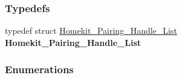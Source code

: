 \subsubsection*{Typedefs}
\begin{DoxyCompactItemize}
\item 
typedef struct \hyperlink{struct_homekit___pairing___handle___list}{Homekit\+\_\+\+Pairing\+\_\+\+Handle\+\_\+\+List} {\bfseries Homekit\+\_\+\+Pairing\+\_\+\+Handle\+\_\+\+List}\hypertarget{group___h_p_s_gaf94fa4a6840e5837e901cfdc34508e62}{}\label{group___h_p_s_gaf94fa4a6840e5837e901cfdc34508e62}

\end{DoxyCompactItemize}
\subsubsection*{Enumerations}
